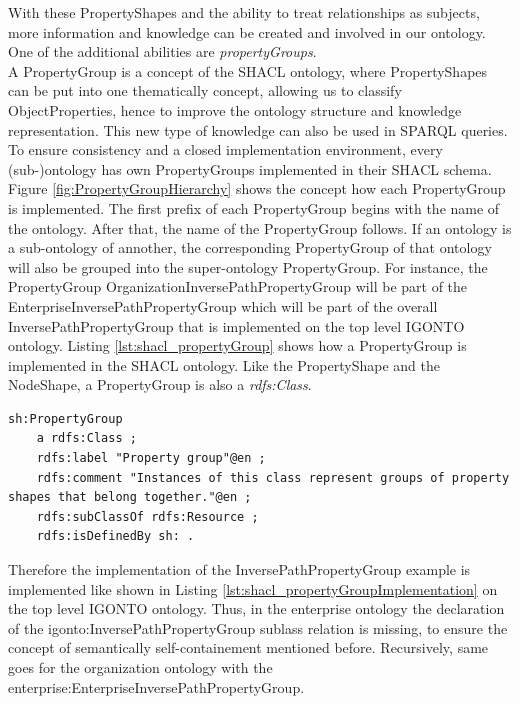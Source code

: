 \documentclass[
  a4paper,  %
  twoside,  %
  bibliography=totoc,
  headsepline,
  cleardoublepage=empty,
  parskip=half,
  draft=false
]{scrbook}
\begin{document}
With these PropertyShapes and the ability to treat relationships as subjects, more information and knowledge can be created and involved in our ontology. One of the additional abilities are \textit{propertyGroups}.\\
A PropertyGroup is a concept of the \acrshort{SHACL} ontology, where PropertyShapes can be put into one thematically concept, allowing us to classify ObjectProperties, hence to improve the ontology structure and knowledge representation. This new type of knowledge can also be used in SPARQL queries. \\
To ensure consistency and a closed implementation environment, every (sub-)ontology has own PropertyGroups implemented in their \acrshort{SHACL} schema. Figure \ref{fig:PropertyGroupHierarchy} shows the concept how each PropertyGroup is implemented. The first prefix of each PropertyGroup begins with the name of the ontology. After that, the name of the PropertyGroup follows. If an ontology is a sub-ontology of annother, the corresponding PropertyGroup of that ontology will also be grouped into the super-ontology PropertyGroup. For instance, the PropertyGroup OrganizationInversePathPropertyGroup will be part of the EnterpriseInversePathPropertyGroup which will be part of the overall InversePathPropertyGroup that is implemented on the top level IGONTO ontology. Listing \ref{lst:shacl_propertyGroup} shows how a PropertyGroup is implemented in the \acrshort{SHACL} ontology. Like the PropertyShape and the NodeShape, a PropertyGroup is also a \textit{rdfs:Class}.  

\begin{lstlisting}[style=turtle, caption={SHACL PropertyGroup definition \cite{SHACL}}]
sh:PropertyGroup
	a rdfs:Class ;
	rdfs:label "Property group"@en ;
	rdfs:comment "Instances of this class represent groups of property shapes that belong together."@en ;
	rdfs:subClassOf rdfs:Resource ;
	rdfs:isDefinedBy sh: .
\end{lstlisting}\label{lst:shacl_propertyGroup}

Therefore the implementation of the InversePathPropertyGroup example is implemented like shown in Listing \ref{lst:shacl_propertyGroupImplementation} on the top level IGONTO ontology. Thus, in the enterprise ontology the declaration of the igonto:InversePathPropertyGroup sublass relation is missing, to ensure the concept of semantically self-containement mentioned before. Recursively, same goes for the organization ontology with the enterprise:EnterpriseInversePathPropertyGroup. 
\end{document}
